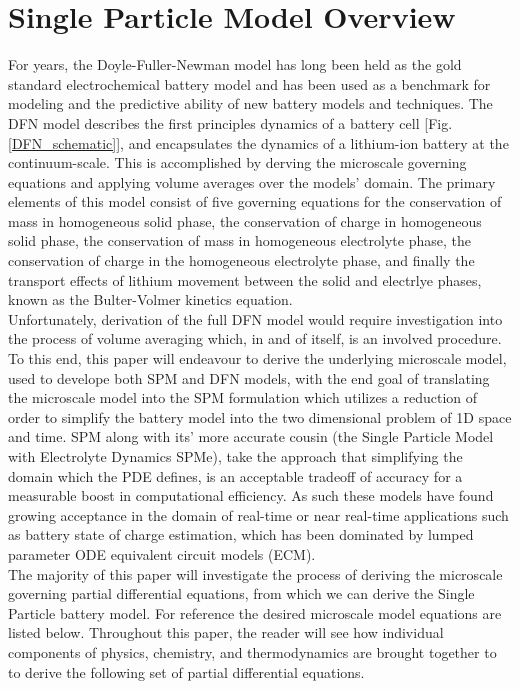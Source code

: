\documentclass[lettersize,journal]{IEEEtran}
\begin{document}
\section{Single Particle Model Overview}
For years, the Doyle-Fuller-Newman model has long been held as the gold standard electrochemical battery model and has been used as a benchmark for modeling and the predictive ability of new battery models and techniques. The DFN model describes the first principles dynamics of a battery cell [Fig. \ref{DFN_schematic}], and encapsulates the dynamics of a lithium-ion battery at the continuum-scale. This is accomplished by derving the microscale governing equations and applying volume averages over the models' domain. The primary elements of this model consist of five governing equations for the conservation of mass in homogeneous solid phase, the conservation of charge in homogeneous solid phase, the conservation of mass in homogeneous electrolyte phase, the conservation of charge in the homogeneous electrolyte phase, and finally the transport effects of lithium movement between the solid and electrlye phases, known as the Bulter-Volmer kinetics equation. \\

Unfortunately, derivation of the full DFN model would require investigation into the process of volume averaging which, in and of itself, is an involved procedure. To this end, this paper will endeavour to derive the underlying microscale model, used to develope both SPM and DFN models, with the end goal of translating the microscale model into the SPM formulation which utilizes a reduction of order to simplify the battery model into the two dimensional problem of 1D space and time. SPM along with its' more accurate cousin (the Single Particle Model with Electrolyte Dynamics {SPMe}), take the approach that simplifying the domain which the PDE defines, is an acceptable tradeoff of accuracy for a measurable boost in computational efficiency. As such these models have found growing acceptance in the domain of real-time or near real-time applications such as battery state of charge estimation, which has been dominated by lumped parameter ODE equivalent circuit models (ECM). \\

 The majority of this paper will investigate the process of deriving the microscale governing partial differential equations, from which we can derive the Single Particle battery model. For reference the desired microscale model equations are listed below. Throughout this paper, the reader will see how individual components of physics, chemistry, and thermodynamics are brought together to to derive the following set of partial differential equations.
\end{document}
